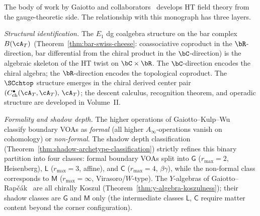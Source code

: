 \begin{remark}
\label{rem:gaiotto-programme-comparison}

The body of work by Gaiotto and
collaborators~\cite{gaiotto-rapchak,CostelloGaiotto2020,GKW2025}
develops HT field theory from the gauge-theoretic side. The
relationship with this monograph has three layers.

\emph{Structural identification.}
The $E_1$ dg coalgebra structure on the bar complex
$B(\cA_T)$
(Theorem~\ref{thm:bar-swiss-cheese}: coassociative coproduct
in the $\bR$-direction, bar differential from the chiral product in
the $\bC$-direction) is the algebraic skeleton of the HT
twist on $\bC \times \bR$. The $\bC$-direction encodes the
chiral algebra; the $\bR$-direction encodes the topological
coproduct. The $\SCchtop$ structure emerges in the chiral derived center
pair $(C^\bullet_{\mathrm{ch}}(\cA_T,\cA_T),\, \cA_T)$; the descent calculus, recognition theorem, and
operadic structure are developed in
Volume~II\@.

\emph{Formality and shadow depth.}
The higher operations of Gaiotto--Kulp--Wu~\cite{GKW2025}
classify boundary VOAs as \emph{formal} (all higher
$A_\infty$-operations vanish on cohomology) or
\emph{non-formal}. The shadow depth classification
(Theorem~\ref{thm:shadow-archetype-classification})
strictly refines this binary partition into four classes:
formal boundary VOAs split into
$\mathsf{G}$ ($r_{\max} = 2$, Heisenberg),
$\mathsf{L}$ ($r_{\max} = 3$, affine), and
$\mathsf{C}$ ($r_{\max} = 4$, $\beta\gamma$), while
the non-formal class corresponds to
$\mathsf{M}$ ($r_{\max} = \infty$, Virasoro/$W$-type).
The $Y$-algebras of Gaiotto--Rap\v{c}\'ak~\cite{gaiotto-rapchak}
are all chirally Koszul
(Theorem~\ref{thm:y-algebra-koszulness}); their shadow
classes are $\mathsf{G}$ and $\mathsf{M}$ only (the
intermediate classes $\mathsf{L}$, $\mathsf{C}$ require
matter content beyond the corner configuration).


\end{remark}
